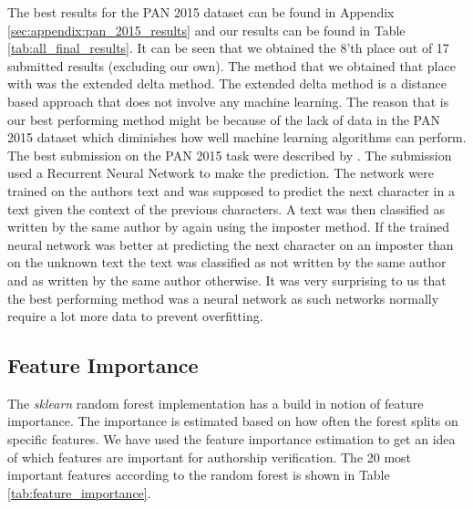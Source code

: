 The best results for the PAN 2015 dataset can be found in Appendix
\ref{sec:appendix:pan_2015_results} and our results can be found in Table
\ref{tab:all_final_results}. It can be seen that we obtained the 8'th place
out of 17 submitted results (excluding our own). The method that we obtained
that place with was the extended delta method. The extended delta method is a
distance based approach that does not involve any machine learning. The reason
that is our best performing method might be because of the lack of data in
the PAN 2015 dataset which diminishes how well machine learning algorithms
can perform. The best submission on the PAN 2015 task were described by
\cite{bagnall:2015}. The submission used a Recurrent Neural Network to make
the prediction. The network were trained on the authors text and was supposed
to predict the next character in a text given the context of the previous
characters. A text was then classified as written by the same author by again
using the imposter method. If the trained neural network was better at
predicting the next character on an imposter than on the unknown text the text
was classified as not written by the same author and as written by the same
author otherwise. It was very surprising to us that the best performing method
was a neural network as such networks normally require a lot more data to
prevent overfitting.

\subsection{Feature Importance}
The \textit{sklearn} random forest implementation has a build in notion of
feature importance. The importance is estimated based on how often the forest
splits on specific features. We have used the feature importance estimation to
get an idea of which features are important for authorship verification. The 20
most important features according to the random forest is shown in Table
\ref{tab:feature_importance}.

